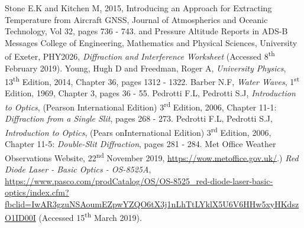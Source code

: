 \documentclass{article}
\begin{document}
\begin{thebibliography}{9}
 Stone E.K and Kitchen M, 2015, Introducing an Approach for Extracting Temperature from Aircraft GNSS, Journal of Atmospherics and Oceanic Technology, Vol 32, pages 736 - 743. 
and Pressure Altitude Reports in ADS-B Messages
 College of Engineering, Mathematics and Physical Sciences, University of Exeter, PHY2026, \textit{Diffraction and Interference Worksheet} (Accessed 8\textsuperscript{th} February 2019).
 Young, Hugh D and Freedman, Roger A, \textit{University Physics}, 13\textsuperscript{th} Edition, 2014, Chapter 36, pages 1312 - 1322.
 Barber N.F, \textit{Water Waves}, 1\textsuperscript{st} Edition, 1969, Chapter 3, pages 36 - 55. 
 Pedrotti F.L, Pedrotti S.J, \textit{Introduction to Optics}, (Pearson International Edition) 3\textsuperscript{rd} Edition, 2006, Chapter 11-1: \textit{Diffraction from a Single Slit}, pages 268 - 273.
 Pedrotti F.L, Pedrotti S.J, \textit{Introduction to Optics},  (Pears onInternational Edition) 3\textsuperscript{rd} Edition, 2006, Chapter 11-5: \textit{Double-Slit Diffraction}, pages 281 - 284.
 Met Office Weather Observations Website, 22\textsuperscript{nd} November 2019,  \url{https://wow.metoffice.gov.uk/}.)
 \textit{Red Diode Laser - Basic Optics - OS-8525A}, 
\url{https://www.pasco.com/prodCatalog/OS/OS-8525_red-diode-laser-basic-optics/index.cfm?fbclid=IwAR3gzuNSAoumEZpwYZQO6tX3j1nLhTtLYklX5U6V6HHw5xyHKdszO1ID00I} (Accessed 15\textsuperscript{th} March 2019).

\end{thebibliography}
\end{document}

